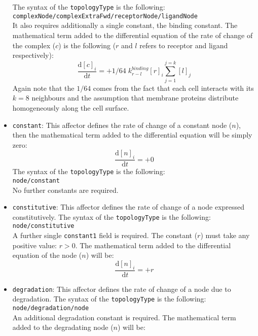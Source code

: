 \documentclass[a4paper, 11pt]{article}
\begin{document}
\begin{itemize}
  The syntax of the \texttt{topologyType} is the following:\\[1.5ex]
  \texttt{complexNode/complexExtraFwd/receptorNode/ligandNode}\\[1.5ex]
  It also requires additionally a single constant, the binding constant.
  The mathematical term added to the differential equation of the rate of change of the complex ($c$) is the following ($r$ and $l$ refers to receptor and ligand respectively):
  \begin{equation}
    \frac{\mathrm{d}[c]_i}{\mathrm{d}t} = +  1/64\; k^{binding}_{r-l}[r]_i\sum_{j = 1}^{j = k}[l]_j
  \end{equation}
  Again note that the $1/64$ comes from the fact that each cell interacts with its $k=8$ neighbours and the assumption that membrane proteins distribute homogeneously along the cell surface.
\item \texttt{constant}: 
  This affector defines the rate of change of a constant node ($n$), then the mathematical term added to the differential equation will be simply zero:
  \begin{equation}
    \frac{\mathrm{d}[n]_i}{\mathrm{d}t} = + 0
  \end{equation}
  The syntax of the \texttt{topologyType} is the following:\\[1.5ex]
  \texttt{node/constant}\\[1.5ex]
  No further constants are required.
\item \texttt{constitutive}: 
  This affector defines the rate of change of a node expressed constitutively.
  The syntax of the \texttt{topologyType} is the following:\\[1.5ex]
  \texttt{node/constitutive}\\[1.5ex]
  A further single \texttt{constant1} field is required. 
  The constant ($r$) must take any positive value: $r>0$.
  The mathematical term added to the differential equation of the node ($n$) will be:
  \begin{equation}
    \frac{\mathrm{d}[n]_i}{\mathrm{d}t} = + r
  \end{equation}
\item \texttt{degradation}: 
  This affector defines the rate of change of a node due to degradation.
  The syntax of the \texttt{topologyType} is the following:\\[1.5ex]
  \texttt{node/degradation/node}\\[1.5ex]
  An additional degradation constant is required.
  The mathematical term added to the degradating node ($n$) will be:

\end{itemize}
\end{document}
